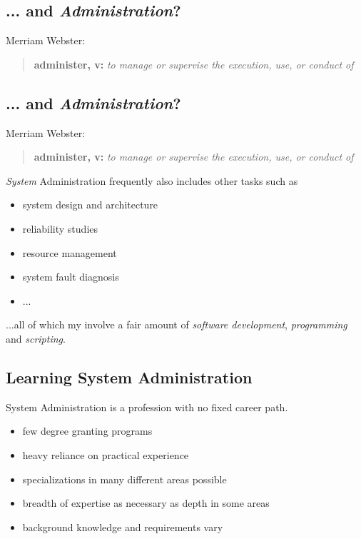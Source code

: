 \documentclass[xga]{xdvislides}
\begin{document}
\subsection{... and {\em Administration}?}
Merriam Webster:
\begin{quote}
	{\bf administer, v:} {\em to manage or supervise the execution, use, or conduct of} \\
\end{quote}

\subsection{... and {\em Administration}?}
Merriam Webster:
\begin{quote}
	{\bf administer, v:} {\em to manage or supervise the execution, use, or conduct of} \\
\end{quote}

{\em System} Administration frequently also includes other tasks such as
\begin{itemize}
	\item system design and architecture
	\item reliability studies
	\item resource management
	\item system fault diagnosis
	\item ...
\end{itemize}
\vspace{.5in}

...all of which my involve a fair amount of {\em software development}, {\em
programming} and {\em scripting}.

\subsection{Learning System Administration}
System Administration is a profession with no fixed career path.

\begin{itemize}
	\item few degree granting programs
	\item heavy reliance on practical experience
	\item specializations in many different areas possible
	\item breadth of expertise as necessary as depth in some areas
	\item background knowledge and requirements vary
\end{itemize}
\end{document}
